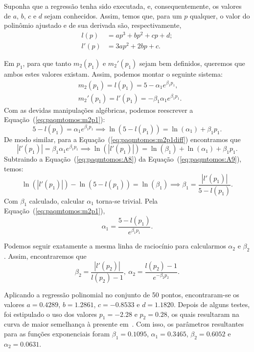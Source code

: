 Suponha que a regressão tenha sido executada, e, consequentemente, os valores de $a$, $b$, $c$ e $d$ sejam conhecidos. Assim, temos que, para um $p$ qualquer, o valor do polinômio ajustado e de sua derivada são, respectivamente,
\begin{align}
    l(p) &= a p^3 + b p^2 + c p + d;\\
    l'(p) &= 3a p^2 + 2 b p + c.
\end{align}

Em $p_1$, para que tanto $m_2(p_1)$ e $m_2'(p_1)$ sejam bem definidos, queremos que ambos estes valores existam. Assim, podemos montar o seguinte sistema:
\begin{align}
    &m_2(p_1) = l(p_1) = 5 - \alpha_1 e^{\beta_1 p_1},\label{eq:paqmtomos:m2p1}\\
    &m_2'(p_1) = l'(p_1) = -\beta_1 \alpha_1 e^{\beta_1 p_1}.\label{eq:paqmtomos:m2p1diff}
\end{align}
Com as devidas manipulações algébricas, podemos reescrever a Equação~(\ref{eq:paqmtomos:m2p1}):
\begin{equation}
    5 - l(p_1) = \alpha_1 e^{\beta_1 p_1} \implies \ln(5 - l(p_1)) = \ln(\alpha_1) + \beta_1 p_1.\label{eq:paqmtomos:A8}
\end{equation}
De modo similar, para a Equação~(\ref{eq:paqmtomos:m2p1diff}) encontramos que
\begin{equation}
    |l'(p_1)| = \beta_1 \alpha_1 e^{\beta_1 p_1} \implies \ln(|l'(p_1)|) = \ln(\beta_1) + \ln(\alpha_1) + \beta_1 p_1.\label{eq:paqmtomos:A9}
\end{equation}
Subtraindo a Equação~(\ref{eq:paqmtomos:A8}) da Equação~(\ref{eq:paqmtomos:A9}), temos:
\begin{equation}
    \ln(|l'(p_1)|) - \ln(5 - l(p_1)) = \ln(\beta_1) \implies \beta_1 = \frac{|l'(p_1)|}{5 - l(p_1)}.
\end{equation}
Com $\beta_1$ calculado, calcular $\alpha_1$ torna-se trivial. Pela Equação~(\ref{eq:paqmtomos:m2p1}),
\begin{equation}
    \alpha_1 = \frac{5 - l(p_1)}{e^{\beta_1 p_1}}.
\end{equation}

Podemos seguir exatamente a mesma linha de raciocínio para calcularmos $\alpha_2$ e $\beta_2$. Assim, encontraremos que
\begin{equation}
    \beta_2 = \frac{|l'(p_2)|}{l(p_2) - 1},\ \alpha_2 = \frac{l(p_2) - 1}{e^{-\beta_2 p_2}}.
\end{equation}

Aplicando a regressão polinomial no conjunto de 50 pontos, encontraram-se os valores $a = 0.4289$, $b = 1.2861$, $c = -0.8533$ e $d = 1.1820$. Depois de alguns testes, foi estipulado o uso dos valores $p_1 = -2.28$ e $p_2 = 0.28$, os quais resultaram na curva de maior semelhança à presente em~\cite{beerends-2002}. Com isso, os parâmetros resultantes para as funções exponenciais foram $\beta_1 = 0.1095$, $\alpha_1 = 0.3465$, $\beta_2 = 0.6052$ e $\alpha_2 = 0.0631$.

